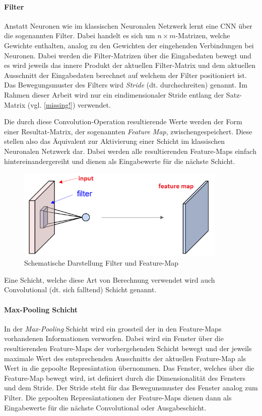 \paragraph{Filter}\label{basic:cnn:filter} Anstatt Neuronen wie im klassischen Neuronalen Netzwerk lernt eine CNN über die sogenannten Filter. Dabei handelt es sich um $n\times m$-Matrizen, welche Gewichte enthalten, analog zu den Gewichten der eingehenden Verbindungen bei Neuronen. Dabei werden die Filter-Matrizen über die Eingabedaten bewegt und es wird jeweils das innere Produkt der aktuellen Filter-Matrix und dem aktuellen Ausschnitt der Eingabedaten berechnet auf welchem der Filter positioniert ist. Das Bewegungsmuster des Filters wird \emph{Stride} (dt. durchschreiten) genannt. Im Rahmen dieser Arbeit wird nur ein eindimensionaler Stride entlang der Satz-Matrix (vgl. \ref{missing!}) verwendet.

Die durch diese Convolution-Operation resultierende Werte werden der Form einer Resultat-Matrix, der sogenannten \emph{Feature Map}, zwischengespeichert. Diese stellen also das Äquivalent zur Aktivierung einer Schicht im klassischen Neuronalen Netzwerk dar. Dabei werden alle resultierenden Feature-Maps einfach hintereinandergereiht und dienen als Eingabewerte für die nächste Schicht. 

\begin{figure}[h]
	\centering
	\includegraphics[width=10cm]{img/filter_feature_map}
	\caption{Schematische Darstellung Filter und Feature-Map}
\end{figure}

Eine Schicht, welche diese Art von Berechnung verwendet wird auch Convolutional (dt. sich falltend) Schicht genannt.

\paragraph{Max-Pooling Schicht} In der \emph{Max-Pooling} Schicht wird ein grossteil der in den Feature-Maps vorhandenen Informationen verworfen. Dabei wird ein Fenster über die resultierenden Feature-Maps der vorhergehenden Schicht bewegt und der jeweils maximale Wert des entsprechenden Ausschnitts der aktuellen Feature-Map als Wert in die gepoolte Represäntation übernommen. Das Fenster, welches über die Feature-Map bewegt wird, ist definiert durch die Dimensionalität des Fensters und dem Stride. Der Stride steht für das Bewegunsmuster des Fenster analog zum Filter. Die gepoolten Represäntationen der Feature-Maps dienen dann als Eingabewerte für die nächste Convolutional oder Ausgabeschicht.

